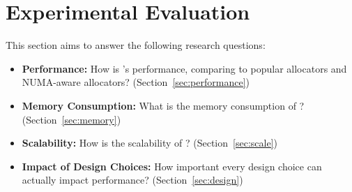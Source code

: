 \section{Experimental Evaluation}
\label{sec:evaluation}

This section aims to answer the following research questions: 

\begin{itemize}
\item \textbf{Performance:} How is \NM{}'s performance, comparing to popular allocators and NUMA-aware allocators? (Section~\ref{sec:performance}) 
\item \textbf{Memory Consumption:} What is the memory consumption of \NM{}? (Section~\ref{sec:memory})
\item \textbf{Scalability:} How is the scalability of \NM{}? (Section~\ref{sec:scale})
\item \textbf{Impact of Design Choices:} How important every design choice can actually impact performance? (Section~\ref{sec:design})	
\end{itemize}

